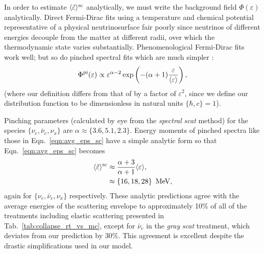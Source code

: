 \documentclass[aps,floatfix,prd,superscriptaddress,twocolumn]{revtex4-1}
\begin{document}
In order to estimate $\langle \tilde{\varepsilon} \rangle^{\rm sc}$ analytically,
we must write the background field $\Phi(\varepsilon)$ analytically.
Direct Fermi-Dirac fits using a temperature and chemical potential
representative of a physical neutrinosurface fair poorly since neutrinos of
different energies decouple from the matter at different radii, over which
the thermodynamic state varies substantially.
Phenomenological Fermi-Dirac fits work well;
but so do pinched spectral fits which are much simpler
\cite{keil2003-pinched_spectra,miri2016-sn_neutrinos}:
\begin{equation}
  \label{eqn:pinched_spectra}
  \Phi^{\rm pi}(\varepsilon) \propto
  \varepsilon^{\alpha-2}
  \exp\left(-(\alpha+1)\frac{\varepsilon}{\langle\varepsilon\rangle}\right),
\end{equation}
(where our definition differs from that of \cite{keil2003-pinched_spectra}
by a factor of
$\varepsilon^2$, since we define our distribution function to be dimensionless
in natural units $\{\hbar,c\}=1$).

Pinching parameters
(calculated by eye from the \emph{spectral} \emph{scat} method)
for the species
$\{\nu_e,\bar{\nu}_e,\nu_x\}$ are $\alpha\approx\{3.6,5.1,2.3\}$.
Energy moments of pinched spectra like those in Eqn.~\ref{eqn:avg_eps_sc}
have a simple analytic form so that Eqn.~\ref{eqn:avg_eps_sc} becomes
\begin{align}
  \label{eqn:pinched_avg_eps_sc_1}
  \langle\tilde{\varepsilon}\rangle^{\rm sc}
  &\approx \frac{\alpha+3}{\alpha+1} \langle\varepsilon\rangle, \\
  \label{eqn:pinched_avg_eps_sc_3}
  &\approx \{16,18,28\}\,~{\rm MeV},
\end{align}
again for $\{\nu_e,\bar{\nu}_e,\nu_x\}$ respectively.
These analytic predictions agree with the average energies of the scattering
envelope to approximately 10\%
of all of the treatments including elastic scattering presented
in Tab.~\ref{tab:collapse_rt_vs_mc}, except for
$\bar{\nu}_e$ in the \emph{gray} \emph{scat} treatment,
which deviates from our prediction by 30\%.
This agreement is excellent despite the drastic
simplifications used in our model.
\end{document}
